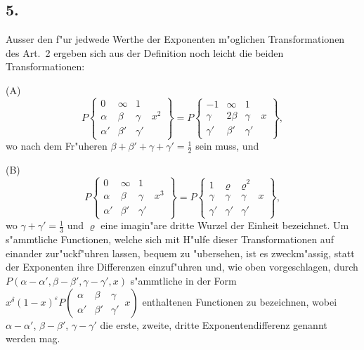 \documentclass[12pt,a4paper]{book}
\theoremstyle{definition}
\theoremstyle{remark}
\begin{document}
\subsection*{5.}

Ausser den f{"u}r jedwede Werthe der Exponenten m{"o}glichen Transformationen des Art.~2 ergeben sich aus der Definition noch leicht die beiden Transformationen:

\medskip
\noindent (A)
\[
P\left\{\begin{array}{ccc|c}
0 & \infty & 1 \\
\alpha & \beta & \gamma & x^2 \\
\alpha' & \beta' & \gamma'
\end{array}\right\}
= P\left\{\begin{array}{ccc|c}
-1 & \infty & 1 \\
\gamma & 2\beta & \gamma & x \\
\gamma' & \beta' & \gamma'
\end{array}\right\},
\]
wo nach dem Fr{"u}heren $\beta + \beta' + \gamma + \gamma' = \frac{1}{2}$ sein muss, und

\medskip
\noindent (B)
\[
P\left\{\begin{array}{ccc|c}
0 & \infty & 1 \\
\alpha & \beta & \gamma & x^3 \\
\alpha' & \beta' & \gamma'
\end{array}\right\}
= P\left\{\begin{array}{ccc|c}
1 & \varrho & \varrho^2 \\
\gamma & \gamma & \gamma & x \\
\gamma' & \gamma' & \gamma'
\end{array}\right\},
\]
wo $\gamma + \gamma' = \frac{1}{3}$ und $\varrho$ eine imagin{"a}re dritte Wurzel der Einheit bezeichnet. Um s{"a}mmtliche Functionen, welche sich mit H{"u}lfe dieser Transformationen auf einander zur{"u}ckf{"u}hren lassen, bequem zu {"u}bersehen, ist es zweckm{"a}ssig, statt der Exponenten ihre Differenzen einzuf{"u}hren und, wie oben vorgeschlagen, durch $P(\alpha - \alpha', \beta - \beta', \gamma - \gamma', x)$ s{"a}mmtliche in der Form $x^{\delta} (1-x)^{\varepsilon} P\left(\begin{array}{ccc|} \alpha & \beta & \gamma \\ \alpha' & \beta' & \gamma' \end{array}\, x\right)$ enthaltenen Functionen zu bezeichnen, wobei $\alpha - \alpha'$, $\beta - \beta'$, $\gamma - \gamma'$ die erste, zweite, dritte Exponentendifferenz genannt werden mag.
\end{document}
